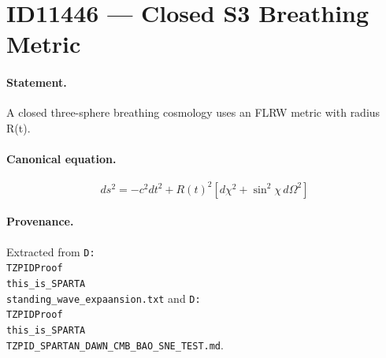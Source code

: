\section*{ID11446 --- Closed S3 Breathing Metric}

\paragraph{Statement.}
A closed three-sphere breathing cosmology uses an FLRW metric with radius R(t).

\paragraph{Canonical equation.}
\[
ds^2=-c^2dt^2+R(t)^2\left[d\chi^2+\sin^2\chi\,d\Omega^2\right]
\]

\paragraph{Provenance.}
Extracted from \texttt{D:\\TZPIDProof\\this\_is\_SPARTA\\standing\_wave\_expaansion.txt} and \texttt{D:\\TZPIDProof\\this\_is\_SPARTA\\TZPID\_SPARTAN\_DAWN\_CMB\_BAO\_SNE\_TEST.md}.
